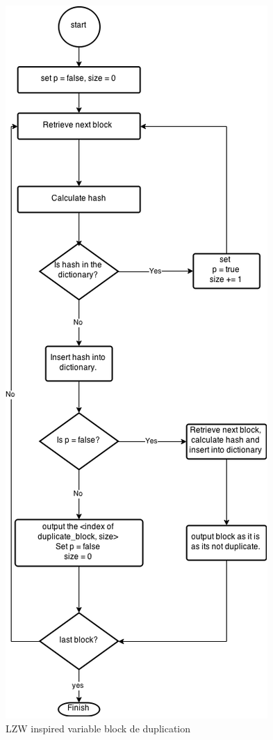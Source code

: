 \documentclass{article}
\begin{document}
   \begin{figure}
   \centering
    \includegraphics[scale=0.5]{dedupAlgo.png}
    \caption{LZW inspired variable block de duplication}
   \end{figure}
   
\end{document}
